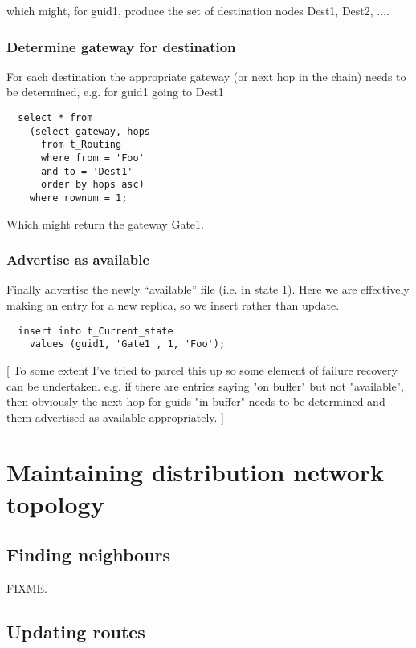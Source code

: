 \documentclass{cmspaper}
\begin{document}
which might, for guid1, produce the set of destination nodes {Dest1, Dest2, ...}. 

\subsubsection{Determine gateway for destination}
For each destination the appropriate gateway (or next hop in the chain) needs to be determined, e.g. for guid1 going to Dest1

{\small\begin{verbatim}
  select * from
    (select gateway, hops
      from t_Routing
      where from = 'Foo'
      and to = 'Dest1'
      order by hops asc)
    where rownum = 1;
\end{verbatim}}

Which might return the gateway Gate1. 

\subsubsection{Advertise as available}

Finally advertise the newly ``available'' file (i.e. in state 1). Here we are effectively making an entry for a new replica, so we insert rather than update.

{\small\begin{verbatim}
  insert into t_Current_state
    values (guid1, 'Gate1', 1, 'Foo');
\end{verbatim}}

[ To some extent I've tried to parcel this up so some element of failure recovery can be undertaken. e.g. if there are entries saying "on buffer" but not "available", then obviously the next hop for guids "in buffer" needs to be determined and them advertised as available appropriately. ]


\section{Maintaining distribution network topology}

\subsection{Finding neighbours}

FIXME.

\subsection{Updating routes}
\end{document}
